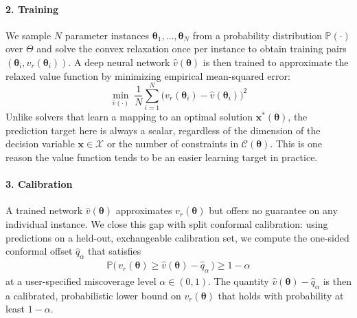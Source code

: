 \documentclass[10pt]{article} %
\theoremstyle{plain}
\theoremstyle{definition}
\theoremstyle{remark}
\begin{document}
\paragraph{2. Training} We sample $N$ parameter instances $\bm{\theta}_1, \ldots, \bm{\theta}_N$ from a probability distribution $\mathbb{P}(\cdot)$ over $\Theta$ and solve the convex relaxation once per instance to obtain training pairs $(\bm{\theta}_i, v_r(\bm{\theta}_i))$. A deep neural network $\hat{v}(\bm{\theta})$ is then trained to approximate the relaxed value function by minimizing empirical mean-squared error:
\begin{equation*}
    \min_{\hat{v}(\cdot)}~ \frac{1}{N} \sum_{i=1}^N \big(v_r(\bm{\theta}_i) - \hat{v}(\bm{\theta}_i)\big)^2
\end{equation*}
Unlike solvers that learn a mapping to an optimal solution $\mathbf{x}^*(\bm{\theta})$, the prediction target here is always a scalar, regardless of the dimension of the decision variable $\mathbf{x} \in \mathcal{X}$ or the number of constraints in $\mathcal{C}(\bm{\theta})$. This is one reason the value function tends to be an easier learning target in practice.

\paragraph{3. Calibration} A trained network $\hat{v}(\bm{\theta})$ approximates $v_r(\bm{\theta})$ but offers no guarantee on any individual instance. We close this gap with split conformal calibration: using predictions on a held-out, exchangeable calibration set, we compute the one-sided conformal offset $\hat{q}_\alpha$ that satisfies
\begin{align*}
    \mathbb{P} \big( \, v_r(\bm{\theta}) \geq \hat{v}(\bm{\theta}) - \hat{q}_\alpha \, \big) \geq 1 - \alpha
\end{align*} at a user-specified miscoverage level $\alpha \in (0, 1)$. The quantity $\hat{v}(\bm{\theta}) - \hat{q}_\alpha$ is then a calibrated, probabilistic lower bound on $v_r(\bm{\theta})$ that holds with probability at least $1 - \alpha$.
\end{document}
